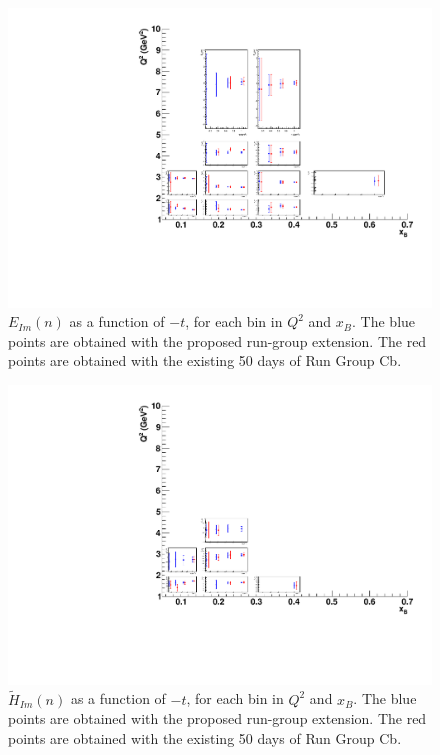 \begin{figure}  
\begin{center}
\includegraphics[width=200mm]{mixed_CFF/100/mixed/CFF_eim_compare3.pdf}
\caption[$E_{Im}(n)$ as a function of $-t$]
{$E_{Im}(n)$ as a function of $-t$, for each bin in $Q^2$ and $x_B$. The blue points are obtained with the proposed run-group extension. The red points are obtained with the existing 50 days of Run Group Cb.}\label{cff_eim}
\end{center}
\end{figure}

\begin{figure}  
\begin{center}
\includegraphics[width=200mm]{mixed_CFF/100/mixed/CFF_htim_compare3.pdf}
\caption[$\tilde{H}_{Im}(n)$ as a function of $-t$]
{$\tilde{H}_{Im}(n)$ as a function of $-t$, for each bin in $Q^2$ and $x_B$. The blue points are obtained with the proposed run-group extension. The red points are obtained with the existing 50 days of Run Group Cb.}\label{cff_htim}
\end{center}
\end{figure}


